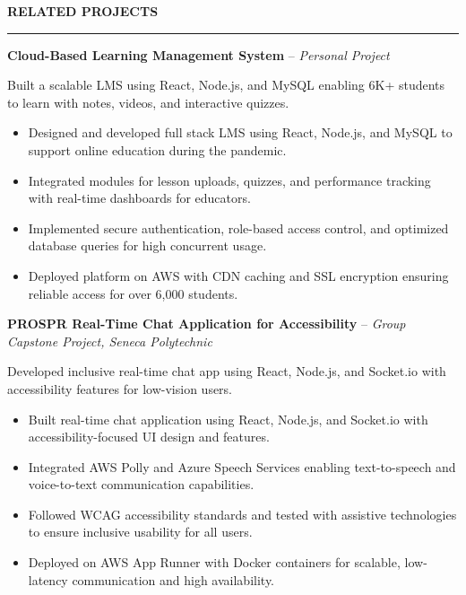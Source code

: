 \documentclass[10pt,letterpaper]{article}
\begin{document}
\vspace{6pt}

\textbf{RELATED PROJECTS}\\[-8pt]
\noindent\rule{\textwidth}{1pt}

\vspace{-2pt}

\textbf{Cloud-Based Learning Management System} -- \emph{Personal Project}

\vspace{-1pt}

Built a scalable LMS using React, Node.js, and MySQL enabling 6K+ students to learn with notes, videos, and interactive quizzes.
\vspace{-1pt}
\begin{itemize}
\item Designed and developed full stack LMS using React, Node.js, and MySQL to support online education during the pandemic.
\item Integrated modules for lesson uploads, quizzes, and performance tracking with real-time dashboards for educators.
\item Implemented secure authentication, role-based access control, and optimized database queries for high concurrent usage.
\item Deployed platform on AWS with CDN caching and SSL encryption ensuring reliable access for over 6,000 students.
\end{itemize}

\textbf{PROSPR  Real-Time Chat Application for Accessibility} -- \emph{Group Capstone Project, Seneca Polytechnic}

\vspace{-1pt}

Developed inclusive real-time chat app using React, Node.js, and Socket.io with accessibility features for low-vision users.
\vspace{-1pt}
\begin{itemize}
\item Built real-time chat application using React, Node.js, and Socket.io with accessibility-focused UI design and features.
\item Integrated AWS Polly and Azure Speech Services enabling text-to-speech and voice-to-text communication capabilities.
\item Followed WCAG accessibility standards and tested with assistive technologies to ensure inclusive usability for all users.
\item Deployed on AWS App Runner with Docker containers for scalable, low-latency communication and high availability.
\end{itemize}
\end{document}
